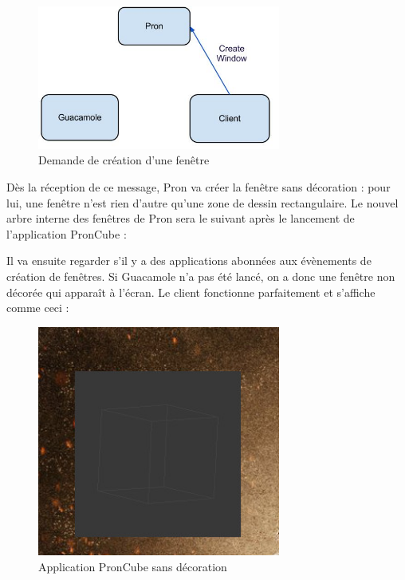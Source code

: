 \begin{figure}[H]
  \centering
  \includegraphics[width=8cm]{images/Guacamole_anim_2.jpg}
  \caption{Demande de création d'une fenêtre}
  \label{fig:guacamole_anim_2}
\end{figure}

Dès la réception de ce message, Pron va créer la fenêtre sans décoration : pour lui, une fenêtre n'est rien d'autre qu'une zone de dessin rectangulaire.
Le nouvel arbre interne des fenêtres de Pron sera le suivant après le lancement de l'application PronCube :

\begin{center}
\end{center}

Il va ensuite regarder s'il y a des applications abonnées aux évènements de création de fenêtres.
Si Guacamole n'a pas été lancé, on a donc une fenêtre non décorée qui apparaît à l'écran.
Le client fonctionne parfaitement et s'affiche comme ceci :

\begin{figure}[H]
  \centering
  \includegraphics[width=8cm]{images/pron_cube_sans_decoration.jpg}
  \caption{Application PronCube sans décoration}
  \label{fig:pron_cube_sans_decoration}
\end{figure}

